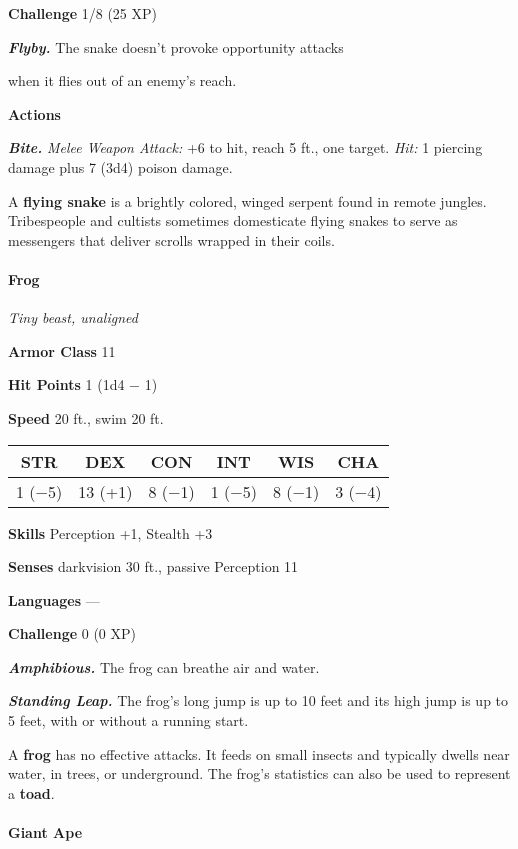 \documentclass[
]{article}
\begin{document}
\textbf{Challenge} 1/8 (25 XP)

\emph{\textbf{Flyby.}} The snake doesn't provoke opportunity attacks

when it flies out of an enemy's reach.

\textbf{Actions}

\emph{\textbf{Bite.}} \emph{Melee Weapon Attack:} +6 to hit, reach 5
ft., one target. \emph{Hit:} 1 piercing damage plus 7 (3d4) poison
damage.

A \textbf{flying snake} is a brightly colored, winged serpent found in
remote jungles. Tribespeople and cultists sometimes domesticate flying
snakes to serve as messengers that deliver scrolls wrapped in their
coils.

\hypertarget{frog}{%
\paragraph{Frog}\label{frog}}

\emph{Tiny beast, unaligned}

\textbf{Armor Class} 11

\textbf{Hit Points} 1 (1d4 − 1)

\textbf{Speed} 20 ft., swim 20 ft.

\begin{longtable}[]{@{}cccccc@{}}
\toprule
STR & DEX & CON & INT & WIS & CHA\tabularnewline
\midrule
\endhead
1 (−5) & 13 (+1) & 8 (−1) & 1 (−5) & 8 (−1) & 3 (−4)\tabularnewline
\bottomrule
\end{longtable}

\textbf{Skills} Perception +1, Stealth +3

\textbf{Senses} darkvision 30 ft., passive Perception 11

\textbf{Languages} ---

\textbf{Challenge} 0 (0 XP)

\emph{\textbf{Amphibious.}} The frog can breathe air and water.

\emph{\textbf{Standing Leap.}} The frog's long jump is up to 10 feet and
its high jump is up to 5 feet, with or without a running start.

A \textbf{frog} has no effective attacks. It feeds on small insects and
typically dwells near water, in trees, or underground. The frog's
statistics can also be used to represent a \textbf{toad}.

\hypertarget{giant-ape}{%
\paragraph{Giant Ape}\label{giant-ape}}
\end{document}

